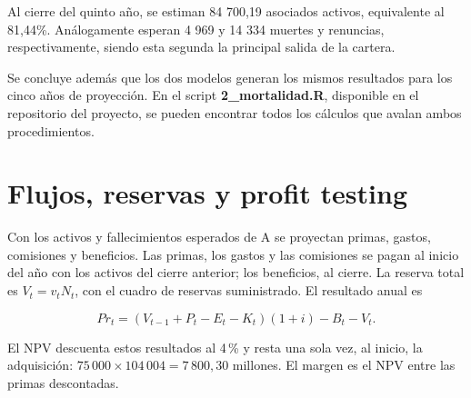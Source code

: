 \documentclass[11pt]{article}
\begin{document}
Al cierre del quinto año, se estiman 84  700,19 asociados activos, equivalente al 81,44\%. Análogamente esperan 4 969 y 14 334 muertes y renuncias, respectivamente, siendo esta segunda la principal salida de la cartera.

Se concluye además que los dos modelos generan los mismos resultados para los cinco años de proyección. En el script \textbf{2\_mortalidad.R}, disponible en el repositorio del proyecto, se pueden encontrar todos los cálculos que avalan ambos procedimientos.


\vspace{-0.6cm}



\section{Flujos, reservas y profit testing}

\vspace{-0.6cm}

Con los activos y fallecimientos esperados de A se proyectan primas, gastos, comisiones y beneficios. Las primas, los gastos y las comisiones se pagan al inicio del año con los activos del cierre anterior; los beneficios, al cierre. La reserva total es $V_t = v_t N_t$, con el cuadro de reservas suministrado. El resultado anual es

\vspace{-0.5cm}

$$
Pr_t = \left(V_{t-1} + P_t - E_t - K_t\right)(1+i) - B_t - V_t .
$$

\vspace{-0.2cm}

El NPV descuenta estos resultados al 4\,\% y resta una sola vez, al inicio, la adquisición: $75\,000 \times 104\,004 = 7\,800{,}30$ millones. El margen es el NPV entre las primas descontadas.
\end{document}
